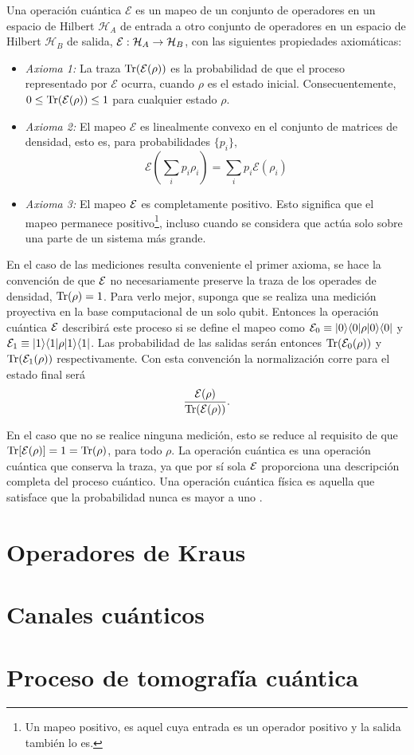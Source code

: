 \begin{definition} Una operación cuántica $\mathcal{E}$ es un mapeo de un conjunto de operadores en un espacio de Hilbert $\mathcal{H}_A$ de entrada a otro conjunto de operadores en un espacio de Hilbert $\mathcal{H}_B$ de salida, $\mathcal{E}: \mathcal{H}_A \rightarrow \mathcal{H}_B$, con las siguientes propiedades axiomáticas:

    \begin{itemize}
        \item \textit{Axioma 1:} La traza ${\rm Tr} (\mathcal{E}(\rho))$ es la probabilidad de que el proceso representado por $\mathcal{E}$ ocurra, cuando $\rho$ es el estado inicial. Consecuentemente, $0 \le {\rm Tr} (\mathcal{E}(\rho)) \le 1$ para cualquier estado $\rho$.
        \item \textit{Axioma 2:} El mapeo $\mathcal{E}$ es linealmente convexo en el conjunto de matrices de densidad, esto es, para probabilidades $\{p_i\}$,\[\mathcal{E}\left(\sum _i p_i \rho _i\right)=\sum_i p_i \mathcal{E}(\rho_i)\]
        \item\textit{Axioma 3:} El mapeo $\mathcal{E}$ es completamente positivo. Esto significa que el mapeo permanece positivo\footnote{Un mapeo positivo, es aquel cuya entrada es un operador positivo y la salida también lo es.}, incluso cuando se considera que actúa solo sobre una parte de un sistema más grande. 
    \end{itemize}
\end{definition}

En el caso de las mediciones resulta conveniente el primer axioma, se hace la convención de que $\mathcal{E}$ no necesariamente preserve la traza de los operades de densidad, ${\rm Tr}(\rho)=1$. Para verlo mejor, suponga que se realiza una medición proyectiva en la base computacional de un solo qubit. Entonces la operación cuántica $\mathcal{E}$ describirá este proceso si se define el mapeo como $\mathcal{E}_0\equiv|0\rangle \langle0|\rho |0\rangle \langle 0|$ y $\mathcal{E}_1\equiv|1\rangle \langle1|\rho |1\rangle \langle 1|$. Las probabilidad de las salidas serán entonces ${\rm Tr} (\mathcal{E}_0(\rho))$ y ${\rm Tr} (\mathcal{E}_1(\rho))$ respectivamente.  Con esta convención la normalización corre para el estado final será \[\dfrac{\mathcal{E}(\rho)}{{\rm Tr} (\mathcal{E} (\rho))}.\]

En el caso que no se realice ninguna medición, esto se reduce al requisito de que ${\rm Tr}[\mathcal{E}(\rho)] = 1 = {\rm Tr}(\rho)$, para todo $\rho$. La operación cuántica es una operación cuántica que conserva la traza, ya que por sí sola $\mathcal{E}$ proporciona una descripción completa del proceso cuántico. Una operación cuántica física es aquella que satisface que la probabilidad nunca es mayor a uno {\cite{nielsen_chuang_2010}}.



\section{Operadores de Kraus}



\section{Canales cuánticos}



\section{Proceso de tomografía cuántica}